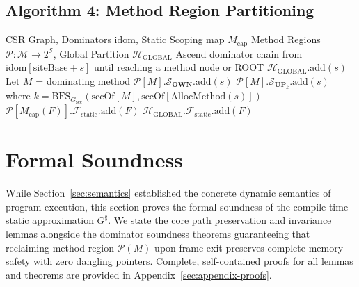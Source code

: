\documentclass[12pt,a4paper]{article}
\newcommand{\OWN}{\textbf{OWN}}
\newcommand{\UP}{\textbf{UP}}
\newcommand{\GLOBAL}{\text{GLOBAL}}
\newcommand{\sccOf}{\text{sccOf}}
\newcommand{\idom}{\text{idom}}
\begin{document}
\subsection{Algorithm 4: Method Region Partitioning}

\begin{algorithm}[H]
\caption{Whole-Program Method Region Partitioning}
\label{alg:partition}
\begin{algorithmic}[1]
\Require CSR Graph, Dominators $\idom$, Static Scoping map $M_{\text{cap}}$
\Ensure Method Regions $\mathcal{P} : \mathcal{M} \to 2^{\mathcal{S}}$, Global Partition $\mathcal{H}_{\GLOBAL}$
  \State Ascend dominator chain from $\idom[\text{siteBase} + s]$ until reaching a method node or ROOT
    \State $\mathcal{H}_{\GLOBAL}.\text{add}(s)$
  \Else
    \State Let $M$ = dominating method
     $\mathcal{P}[M].\mathcal{S}_{\OWN}.\text{add}(s)$ 
    \Else{} $\mathcal{P}[M].\mathcal{S}_{\UP_k}.\text{add}(s)$ where $k = \text{BFS}_{G_{\text{scc}}}(\sccOf[M], \sccOf[\text{AllocMethod}(s)])$
    \EndIf
  \EndIf
\EndFor
{}
   $\mathcal{P}[M_{\text{cap}}(F)].\mathcal{F}_{\text{static}}.\text{add}(F)$
  \Else{} $\mathcal{H}_{\GLOBAL}.\mathcal{F}_{\text{static}}.\text{add}(F)$
  \EndIf
\EndFor
\end{algorithmic}
\end{algorithm}

\section{Formal Soundness}
\label{sec:proofs}

While Section~\ref{sec:semantics} established the concrete dynamic semantics of program execution, this section proves the formal soundness of the compile-time static approximation $G^\sharp$. We state the core path preservation and invariance lemmas alongside the dominator soundness theorems guaranteeing that reclaiming method region $\mathcal{P}(M)$ upon frame exit preserves complete memory safety with zero dangling pointers. Complete, self-contained proofs for all lemmas and theorems are provided in Appendix~\ref{sec:appendix-proofs}.
\end{document}
